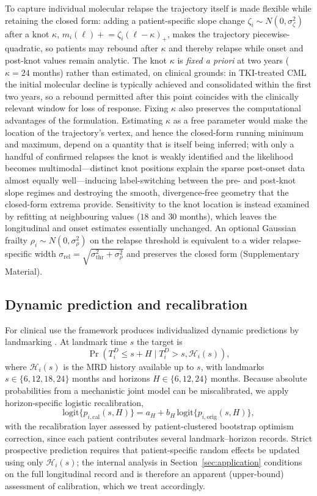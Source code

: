 \documentclass[11pt]{article}
\begin{document}
To capture individual molecular relapse the trajectory itself is made flexible
while retaining the closed form: adding a patient-specific slope change
$\zeta_i\sim N(0,\sigma_\zeta^2)$ after a knot $\kappa$,
$m_i(\ell)\mathrel{+}{=}\zeta_i(\ell-\kappa)_+$, makes the trajectory
piecewise-quadratic, so patients may rebound after $\kappa$ and thereby relapse
while onset and post-knot values remain analytic. The knot $\kappa$ is
\emph{fixed a priori} at two years ($\kappa=24$ months) rather than estimated,
on clinical grounds: in TKI-treated CML the initial molecular decline is
typically achieved and consolidated within the first two years, so a rebound
permitted after this point coincides with the clinically relevant window for
loss of response. Fixing $\kappa$ also preserves the computational advantages of
the formulation. Estimating $\kappa$ as a free parameter would make the location
of the trajectory's vertex, and hence the closed-form running minimum and
maximum, depend on a quantity that is itself being inferred; with only a handful
of confirmed relapses the knot is weakly identified and the likelihood becomes
multimodal---distinct knot positions explain the sparse post-onset data almost
equally well---inducing label-switching between the pre- and post-knot slope
regimes and destroying the smooth, divergence-free geometry that the closed-form
extrema provide. Sensitivity to the knot location is instead examined by
refitting at neighbouring values ($18$ and $30$ months), which leaves the
longitudinal and onset estimates essentially unchanged. An optional Gaussian frailty
$\rho_i\sim N(0,\sigma_\rho^2)$ on the relapse threshold is equivalent to a
wider relapse-specific width
$\sigma_{\mathrm{rel}}=\sqrt{\sigma_{\mathrm{thr}}^2+\sigma_\rho^2}$ and
preserves the closed form (Supplementary Material).

\subsection{Dynamic prediction and recalibration}
\label{sec:dynamic}

For clinical use the framework produces individualized dynamic predictions by
landmarking \cite{vanHouwelingen2007Landmarking,Rizopoulos2011DynamicPredictions}.
At landmark time $s$ the target is
\[
\Pr(T_i^D\le s+H\mid T_i^D>s,\mathcal H_i(s)),
\]
where $\mathcal H_i(s)$ is the MRD history available up to $s$, with
landmarks $s\in\{6,12,18,24\}$ months and horizons $H\in\{6,12,24\}$
months. Because absolute probabilities from a mechanistic joint model can
be miscalibrated, we apply horizon-specific logistic recalibration,
\[
\mathrm{logit}\{p_{i,\mathrm{cal}}(s,H)\}
=a_H+b_H\,\mathrm{logit}\{p_{i,\mathrm{orig}}(s,H)\},
\]
with the recalibration layer assessed by patient-clustered bootstrap optimism
correction, since each patient contributes several landmark--horizon records.
Strict prospective prediction requires that patient-specific random
effects be updated using only $\mathcal H_i(s)$; the internal analysis in
Section~\ref{sec:application} conditions on the full longitudinal record
and is therefore an apparent (upper-bound) assessment of calibration,
which we treat accordingly.
\end{document}
